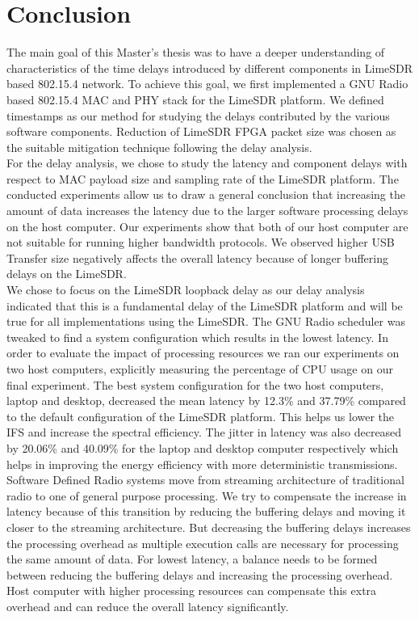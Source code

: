 \chapter{Conclusion}

The main goal of this Master’s thesis was to have a deeper understanding of characteristics of the time delays introduced by different components in LimeSDR based 802.15.4 network. To achieve this goal, we first implemented a GNU Radio based 802.15.4 MAC and PHY stack for the LimeSDR platform. We defined timestamps as our method for studying the delays contributed by the various software components. Reduction of LimeSDR FPGA packet size was chosen as the suitable mitigation technique following the delay analysis. \\

For the delay analysis, we chose to study the latency and component delays with respect to MAC payload size and sampling rate of the LimeSDR platform. The conducted experiments allow us to draw a general conclusion that increasing the amount of data increases the latency due to the larger software processing delays on the host computer. Our experiments show that both of our host computer are not suitable for running higher bandwidth protocols. We observed higher USB Transfer size negatively affects the overall latency because of longer buffering delays on the LimeSDR.\\

We chose to focus on the LimeSDR loopback delay as our delay analysis indicated that this is a fundamental delay of the LimeSDR platform and will be true for all implementations using the LimeSDR. The GNU Radio scheduler was tweaked to find a system configuration which results in the lowest latency. In order to evaluate the impact of processing resources we ran our experiments on two host computers, explicitly measuring the percentage of CPU usage on our final experiment.
The best system configuration for the two host computers, laptop and desktop, decreased the mean latency by 12.3\% and 37.79\% compared to the default configuration of the LimeSDR platform.
This helps us lower the \ac{IFS} and increase the spectral efficiency.
The jitter in latency was also decreased by 20.06\% and 40.09\% for the laptop and desktop computer respectively which helps in improving the energy efficiency with more deterministic transmissions.\\


Software Defined Radio systems move from streaming architecture of traditional radio to one of general purpose processing. We try to compensate the increase in latency because of this transition by reducing the buffering delays and moving it closer to the streaming architecture. But decreasing the buffering delays increases the processing overhead as multiple execution calls are necessary for processing the same amount of data. For lowest latency, a balance needs to be formed between reducing the buffering delays and increasing the processing overhead. Host computer with higher processing resources can compensate this extra overhead and can reduce the overall latency significantly.\\

